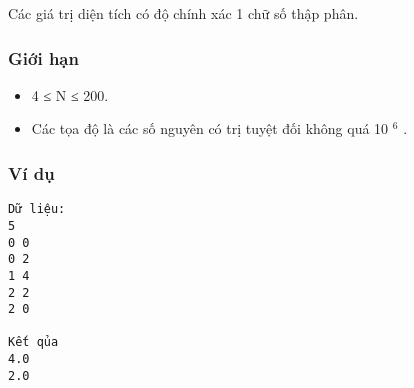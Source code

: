    Các giá trị diện tích có độ chính xác 1 chữ số thập phân.  

\subsubsection{   Giới hạn  }
\begin{itemize}
	\item     4 ≤ N ≤ 200.   
	\item     Các tọa độ là các số nguyên có trị tuyệt đối không quá 10    $^     6    $    .   
\end{itemize}

\subsubsection{   Ví dụ  }
\begin{verbatim}
Dữ liệu:
5
0 0
0 2
1 4
2 2
2 0

Kết qủa
4.0
2.0
\end{verbatim}